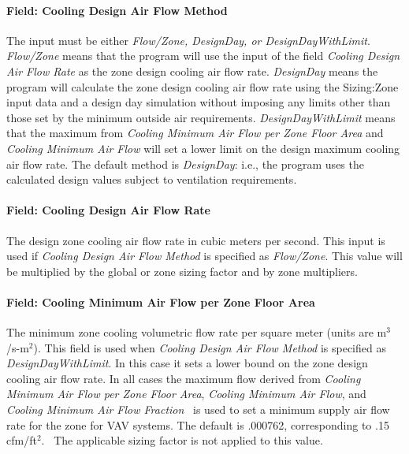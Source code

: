 \paragraph{Field: Cooling Design Air Flow Method}\label{field-cooling-design-air-flow-method}

The input must be either \emph{Flow/Zone, DesignDay, or DesignDayWithLimit}. \emph{Flow/Zone} means that the program will use the input of the field \emph{Cooling Design Air Flow Rate} as the zone design cooling air flow rate. \emph{DesignDay} means the program will calculate the zone design cooling air flow rate using the Sizing:Zone input data and a design day simulation without imposing any limits other than those set by the minimum outside air requirements. \emph{DesignDayWithLimit} means that the maximum from \emph{Cooling Minimum Air Flow per Zone Floor Area} and \emph{Cooling Minimum Air Flow} will set a lower limit on the design maximum cooling air flow rate. The default method is \emph{DesignDay}: i.e., the program uses the calculated design values subject to ventilation requirements.

\paragraph{Field: Cooling Design Air Flow Rate}\label{field-cooling-design-air-flow-rate}

The design zone cooling air flow rate in cubic meters per second. This input is used if \emph{Cooling Design Air Flow Method} is specified as \emph{Flow/Zone}. This value will be multiplied by the global or zone sizing factor and by zone multipliers.

\paragraph{Field: Cooling Minimum Air Flow per Zone Floor Area}\label{field-cooling-minimum-air-flow-per-zone-floor-area}

The minimum zone cooling volumetric flow rate per square meter (units are m\(^{3}\)/s-m\(^{2}\)). This field is used when \emph{Cooling Design Air Flow Method} is specified as \emph{DesignDayWithLimit}. In this case it sets a lower bound on the zone design cooling air flow rate. In all cases the maximum flow derived from \emph{Cooling Minimum Air Flow per Zone Floor Area}, \emph{Cooling Minimum Air Flow}, and \emph{Cooling Minimum Air Flow Fraction}~ is used to set a minimum supply air flow rate for the zone for VAV systems. The default is .000762, corresponding to .15 cfm/ft\(^{2}\).~ The applicable sizing factor is not applied to this value.

